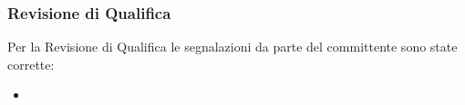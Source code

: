 		\subsubsection{Revisione di Qualifica}
		
		Per la Revisione di Qualifica le segnalazioni da parte del committente sono state corrette:
		
		\begin{itemize}
			\item 
		\end{itemize}


	
